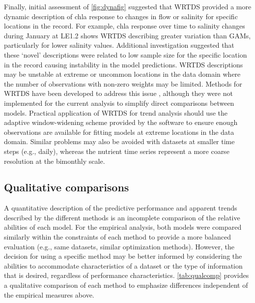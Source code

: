 \documentclass[letterpaper,12pt,oneside]{article}\usepackage[]{graphicx}\usepackage[]{color}
\begin{document}
Finally, initial assessment of \cref{fig:dynafig} suggested that \ac{WRTDS} provided a more dynamic description of \ac{chla} response to changes in flow or salinity for specific locations in the record.  For example, \ac{chla} response over time to salinity changes during January at LE1.2 shows \ac{WRTDS} describing greater variation than \acp{GAM}, particularly for lower salinity values.  Additional investigation suggested that these `novel' descriptions were related to low sample size for the specific location in the record causing instability in the model predictions.   \ac{WRTDS} descriptions may be unstable at extreme or uncommon locations in the data domain where the number of observations with non-zero weights may be limited.  Methods for \ac{WRTDS} have been developed to address this issue \citep[i.e., automated window width increases with low sample sizes,][]{Hirsch10}, although they were not implemented for the current analysis to simplify direct comparisons between models. Practical application of \ac{WRTDS} for trend analysis should use the adaptive window-widening scheme provided by the software \citep[i.e.,][]{Hirsch14} to ensure enough observations are available for fitting models at extreme locations in the data domain.  Similar problems may also be avoided with datasets at smaller time steps (e.g., daily), whereas the nutrient time series represent a more coarse resolution at the bimonthly scale.    

\subsection*{Qualitative comparisons}

A quantitative description of the predictive performance and apparent trends described by the different methods is an incomplete comparison of the relative abilities of each model. For the empirical analysis, both models were compared similarly within the constraints of each method to provide a more balanced evaluation (e.g., same datasets, similar optimization methods).  However, the decision for using a specific method may be better informed by considering the abilities to accommodate characteristics of a dataset or the type of information that is desired, regardless of performance characteristics. \cref{tab:qualcomp} provides a qualitative comparison of each method to emphasize differences independent of the empirical measures above. 
\end{document}
